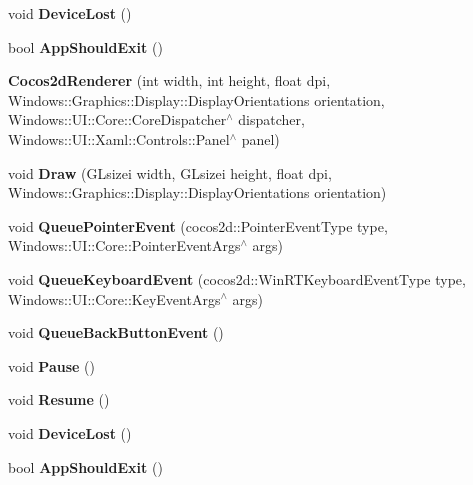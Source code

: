 \begin{DoxyCompactItemize}
\item 
\mbox{\label{classCocos2dRenderer_a1a81f328457f31a967027be669287b40}} 
void {\bfseries Device\+Lost} ()
\item 
\mbox{\label{classCocos2dRenderer_afc28959fe03cfcfc94175ff5e3b16edd}} 
bool {\bfseries App\+Should\+Exit} ()
\item 
\mbox{\label{classCocos2dRenderer_aebeabf98d4e38453f7b0037f1696298e}} 
{\bfseries Cocos2d\+Renderer} (int width, int height, float dpi, Windows\+::\+Graphics\+::\+Display\+::\+Display\+Orientations orientation, Windows\+::\+U\+I\+::\+Core\+::\+Core\+Dispatcher$^\wedge$ dispatcher, Windows\+::\+U\+I\+::\+Xaml\+::\+Controls\+::\+Panel$^\wedge$ panel)
\item 
\mbox{\label{classCocos2dRenderer_a189eebc46e0296e668d284291833a882}} 
void {\bfseries Draw} (G\+Lsizei width, G\+Lsizei height, float dpi, Windows\+::\+Graphics\+::\+Display\+::\+Display\+Orientations orientation)
\item 
\mbox{\label{classCocos2dRenderer_a18483fe8392de98f6eb608d34a4f9a65}} 
void {\bfseries Queue\+Pointer\+Event} (cocos2d\+::\+Pointer\+Event\+Type type, Windows\+::\+U\+I\+::\+Core\+::\+Pointer\+Event\+Args$^\wedge$ args)
\item 
\mbox{\label{classCocos2dRenderer_ae8bb09c38904a2658c75ab5e6d0ed224}} 
void {\bfseries Queue\+Keyboard\+Event} (cocos2d\+::\+Win\+R\+T\+Keyboard\+Event\+Type type, Windows\+::\+U\+I\+::\+Core\+::\+Key\+Event\+Args$^\wedge$ args)
\item 
\mbox{\label{classCocos2dRenderer_a4c81bf54ee380343b7646e4f65583e58}} 
void {\bfseries Queue\+Back\+Button\+Event} ()
\item 
\mbox{\label{classCocos2dRenderer_aade59afd80ea1bcfb353b67bcf76831d}} 
void {\bfseries Pause} ()
\item 
\mbox{\label{classCocos2dRenderer_ac8016f2e5b35c0bf1e6c2dfe4d076394}} 
void {\bfseries Resume} ()
\item 
\mbox{\label{classCocos2dRenderer_a1a81f328457f31a967027be669287b40}} 
void {\bfseries Device\+Lost} ()
\item 
\mbox{\label{classCocos2dRenderer_afc28959fe03cfcfc94175ff5e3b16edd}} 
bool {\bfseries App\+Should\+Exit} ()
\end{DoxyCompactItemize}


